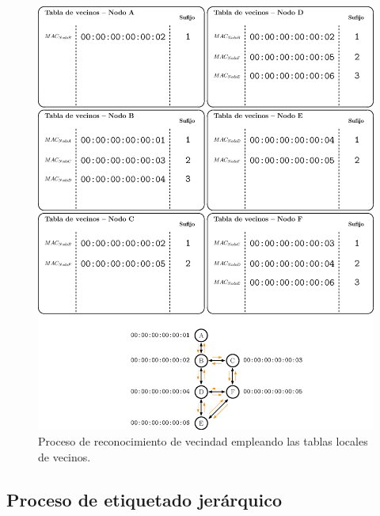 \begin{figure}[ht!]
    \centering
    \includegraphics[width=\textwidth]{fig/04_in-band/in_band_2.eps}
    \caption{Proceso de reconocimiento de vecindad empleando las tablas locales de vecinos.}
    \label{fig:in_band_2}
\end{figure}

\subsection{Proceso de etiquetado jerárquico}
\label{subsubsec:procesoEtiquetado}

